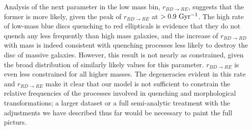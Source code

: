 \documentclass[useAMS,usenatbib]{mn2e}
\begin{document}
 Analysis of the next parameter in the low mass bin, $r_{BD\rightarrow RE}$, suggests that the former is more likely, given the peak of $r_{BD \rightarrow RE}$ at $>0.9 ~\rm Gyr^{-1}$. The high rate of low-mass blue discs quenching to red ellipticals is evidence that they do not quench any less frequently than high mass galaxies, and the increase of $r_{BD \rightarrow RD}$ with mass is indeed consistent with quenching processes less likely to destroy the disc of massive galaxies. However, this result is not nearly as constrained, given the broad distribution of similarly likely values for this parameter. $r_{BD \rightarrow RE}$ is even less constrained for all higher masses. The degeneracies evident in this rate and $r_{RD \rightarrow RE}$ make it clear that our model is not sufficient to constrain the relative frequencies of the processes involved in quenching and morphological transformations; a larger dataset or a full semi-analytic treatment with the adjustments we have described thus far would be necessary to paint the full picturs. 
\end{document}
